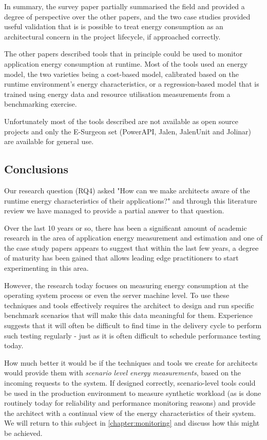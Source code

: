 In summary, the survey paper partially summarised the field and provided a degree of perspective over the other papers, and the two case studies provided useful validation that is is possible to treat energy consumption as an architectural concern in the project lifecycle, if approached correctly.

The other papers described tools that in principle could be used to monitor application energy consumption at runtime.  Most of the tools used an energy model, the two varieties being a cost-based model, calibrated based on the runtime environment's energy characteristics, or a regression-based model that is trained using energy data and resource utilisation measurements from a benchmarking exercise.

Unfortunately most of the tools described are not available as open source projects and only the E-Surgeon set (PowerAPI, Jalen, JalenUnit and Jolinar) are available for general use.


\subsection{Conclusions}

Our research question (RQ4) asked "How can we make architects aware of the runtime energy characteristics of their applications?" and through this literature review we have managed to provide a partial answer to that question.

Over the last 10 years or so, there has been a significant amount of academic research in the area of application energy measurement and estimation and one of the case study papers \cite{jagroep2016-comparingreleases} appears to suggest that within the last few years, a degree of maturity has been gained that allows leading edge practitioners to start experimenting in this area.

However, the research today focuses on measuring energy consumption at the operating system process or even the server machine level.  To use these techniques and tools effectively requires the architect to design and run specific benchmark scenarios that will make this data meaningful for them.  Experience suggests that it will often be difficult to find time in the delivery cycle to perform such testing regularly - just as it is often difficult to schedule performance testing today.

How much better it would be if the techniques and tools we create for architects would provide them with \emph{scenario level energy measurements}, based on the incoming requests to the system.  If designed correctly, scenario-level tools could be used in the production environment to measure synthetic workload (as is done routinely today for reliability and performance monitoring reasons) and provide the architect with a continual view of the energy characteristics of their system.  We will return to this subject in \cref{chapter:monitoring} and discuss how this might be achieved.

